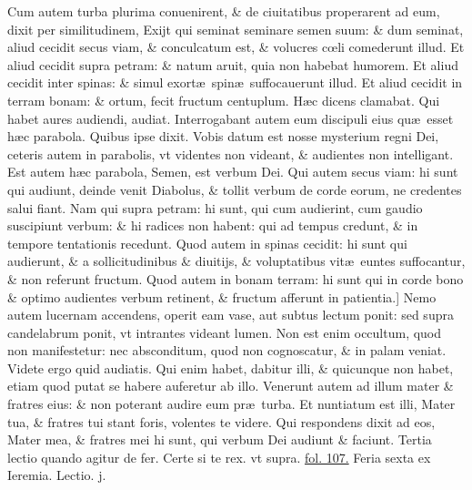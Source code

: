 \documentclass[a5paper,10pt]{book}
\def\leftmarginnote{%
	\lrmarginnote{\hskip -\marginparsep \hskip -6.5em}}
\def\rightmarginnote{%
	\lrmarginnote{\hskip\columnwidth \hskip -1em}}
\def\ae{æ}
\def\oe{œ}
\begin{document}
\begin{multicols*}{2}
Cum\leftmarginnote{\begin{flushright}B\end{flushright}} autem turba plurima conuenirent, \& de ciuitatibus properarent ad eum, dixit per similitudinem, Exijt qui seminat seminare semen suum: \& dum seminat, aliud cecidit secus viam, \& conculcatum est, \& volucres c\oe li comederunt illud.
Et aliud cecidit supra petram: \& natum aruit, quia non habebat humorem.
Et aliud cecidit inter spinas: \& simul exort\ae \ spin\ae \ suffocauerunt illud.
Et aliud cecidit in terram bonam: \& ortum, fecit fructum centuplum.
H\ae c dicens clamabat. Qui habet aures audiendi, audiat.
Interrogabant autem eum discipuli eius qu\ae \ esset h\ae c parabola.
Quibus ipse dixit. Vobis datum est nosse mysterium regni Dei, ceteris autem in parabolis, vt videntes non videant, \& audientes non intelligant.
Est autem h\ae c parabola, Semen, est verbum Dei.
Qui autem secus viam: hi sunt qui audiunt, deinde venit Diabolus, \& tollit verbum de corde eorum, ne credentes salui fiant.
Nam qui supra petram: hi sunt, qui cum audierint, cum gaudio suscipiunt verbum: \& hi radices non habent: qui ad tempus credunt, \& in tempore tentationis recedunt.
Quod autem in spinas cecidit: hi sunt qui audierunt, \& a sollicitudinibus \& diuitijs, \& voluptatibus vit\ae \ euntes suffocantur, \& non referunt fructum.
Quod autem in bonam terram: hi sunt qui in corde bono \& optimo audientes verbum retinent, \& fructum afferunt in patientia.]
Nemo\rightmarginnote{C} autem lucernam accendens, operit eam vase, aut subtus lectum ponit: sed supra candelabrum ponit, vt intrantes videant lumen.
Non est enim occultum, quod non manifestetur: nec absconditum, quod non cognoscatur, \& in palam veniat.
Videte ergo quid audiatis. Qui enim
habet, dabitur illi, \& quicunque non habet, etiam quod putat se habere auferetur ab illo.
Venerunt autem ad illum mater \& fratres eius: \& non poterant audire eum pr\ae \ turba.
Et nuntiatum est illi, Mater tua, \& fratres tui stant foris, volentes te videre.
Qui respondens dixit ad eos, Mater mea, \& fratres mei hi sunt, qui verbum Dei audiunt \& faciunt.
\newline \color{red} Tertia lectio quando agitur de fer. \color{black} Certe si te rex. \color{red} vt supra. \color{black} \hyperlink{page.107}{fol. 107.}
\newline {} \color{red} \hypertarget{FRI-TERTIA-ADV}{Feria sexta} ex Ieremia. \hfill Lectio. j. \color{black}
\vspace{-.25em}

\end{multicols*}
\end{document}
